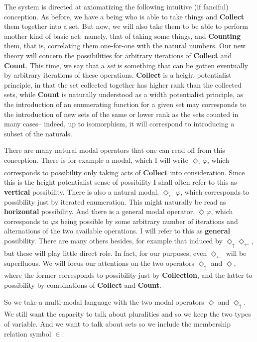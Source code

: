 \documentclass{article}
\newcommand{\du}{\Diamond_\uparrow}
\newcommand{\dl}{\Diamond_\leftarrow}
\begin{document}
The system is directed at axiomatizing the following intuitive (if fanciful) conception.
As before, we have a being who is able to take things and {\bf Collect} them together into a set.
But now, we will also take them to be able to perform another kind of basic act: namely, 
that of taking some things, and {\bf Counting} them, that is, correlating them one-for-one
with the natural numbers. Our new theory will concern the possibilities for arbitrary iterations 
of {\bf Collect} and {\bf Count}. This time, we say that a \emph{set} is something that can be 
gotten eventually by arbitrary iterations of these operations. {\bf Collect} is a height potentialist 
principle, in that the set collected together has higher rank than the collected sets, 
while {\bf Count} is naturally understood as a width potentialist principle, 
as the introduction of an enumerating function for a given set may corresponds to the introduction 
of new sets of the same or lower rank as the sets counted in many cases--
indeed, up to isomorphism, it will correspond to introducing a subset of the naturals.

There are many natural modal operators that one can read off from this conception. 
There is for example a modal, which I will write $\du \varphi$, which corresponds to 
possibility only taking acts of {\bf Collect} into consideration. Since this is the 
height potentialist sense of possibility I shall often refer to this as {\bf vertical}
possibility. There is also a natural modal, $\dl \varphi$, which corresponds to possibility 
just by iterated enumeration. This might naturally be read as {\bf horizontal} possibility.
 And there is a general modal operator, $\Diamond \varphi$, which 
corresponds to $\varphi$s being possible by some arbitrary number of iterations and alternations 
of the two available operations. I will refer to this as {\bf general} possibility. There are 
many others besides, for example that induced by $\du\dl$, but these will play little direct role.
In fact, for our purposes, even $\dl$ will be superfluous. We will focus our attentions on 
the two operators $\du$ and $\Diamond$, where the former corresponds to possibility just by 
{\bf Collection}, and the latter to possibility by combinations of {\bf Collect} and {\bf Count}.

So we take a multi-modal language with the two modal operators $\Diamond$ and $\du$. We still 
want the capacity to talk about pluralities and so we keep the two types of variable. 
And we want to talk about sets so we include the membership relation symbol $\in$. 
\end{document}
